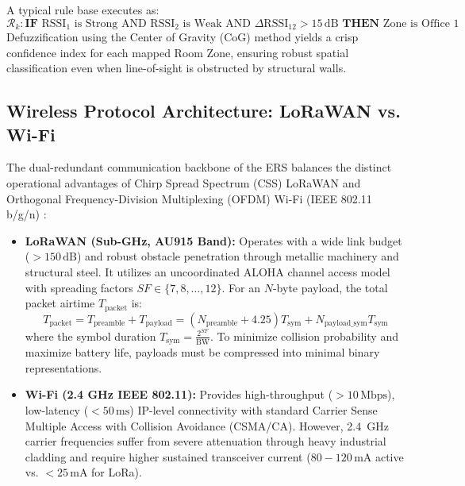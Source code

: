 A typical rule base executes as:
\begin{equation*}
\mathcal{R}_k: \textbf{IF } \text{RSSI}_1 \text{ is Strong AND } \text{RSSI}_2 \text{ is Weak AND } \Delta \text{RSSI}_{12} > 15\,\text{dB} \textbf{ THEN } \text{Zone is Office 1}
\end{equation*}
Defuzzification using the Center of Gravity (CoG) method yields a crisp confidence index for each mapped Room Zone, ensuring robust spatial classification even when line-of-sight is obstructed by structural walls.

\subsection{Wireless Protocol Architecture: LoRaWAN vs. Wi-Fi}
The dual-redundant communication backbone of the ERS balances the distinct operational advantages of Chirp Spread Spectrum (CSS) LoRaWAN and Orthogonal Frequency-Division Multiplexing (OFDM) Wi-Fi (IEEE 802.11 b/g/n) \cite{wifi_lora_synergy}:

\begin{itemize}
    \item \textbf{LoRaWAN (Sub-GHz, AU915 Band):} Operates with a wide link budget ($>150\,\text{dB}$) and robust obstacle penetration through metallic machinery and structural steel. It utilizes an uncoordinated ALOHA channel access model with spreading factors $SF \in \{7, 8, \dots, 12\}$. For an $N$-byte payload, the total packet airtime $T_{\text{packet}}$ is:
    \begin{equation}
    \label{eq:lora_airtime}
    T_{\text{packet}} = T_{\text{preamble}} + T_{\text{payload}} = \left(N_{\text{preamble}} + 4.25\right) T_{\text{sym}} + N_{\text{payload\_sym}} T_{\text{sym}}
    \end{equation}
    where the symbol duration $T_{\text{sym}} = \frac{2^{SF}}{\text{BW}}$. To minimize collision probability and maximize battery life, payloads must be compressed into minimal binary representations.
    \item \textbf{Wi-Fi (2.4 GHz IEEE 802.11):} Provides high-throughput ($>10\,\text{Mbps}$), low-latency ($<50\,\text{ms}$) IP-level connectivity with standard Carrier Sense Multiple Access with Collision Avoidance (CSMA/CA). However, 2.4~GHz carrier frequencies suffer from severe attenuation through heavy industrial cladding and require higher sustained transceiver current ($80-120\,\text{mA}$ active vs. $<25\,\text{mA}$ for LoRa).
\end{itemize}

